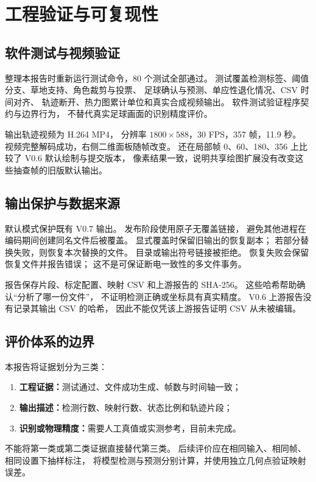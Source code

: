 \documentclass[UTF8,fontset=fandol,11pt,a4paper]{ctexart}
\begin{document}
\section{工程验证与可复现性}

\subsection{软件测试与视频验证}
整理本报告时重新运行测试命令，80 个测试全部通过。
测试覆盖检测标签、阈值分支、草地支持、角色裁剪与投票、
足球确认与预测、单应性退化情况、CSV 时间对齐、
轨迹断开、热力图累计单位和真实合成视频输出。
软件测试验证程序契约与边界行为，
不替代真实足球画面的识别精度评价。

输出轨迹视频为 H.264 MP4，
分辨率 $1800\times588$，30 FPS，357 帧，11.9 秒。
视频完整解码成功，右侧二维面板随帧改变。
还在局部帧 0、60、180、356 上比较了 V0.6 默认绘制与提交版本，
像素结果一致，说明共享绘图扩展没有改变这些抽查帧的旧版默认输出。

\subsection{输出保护与数据来源}
默认模式保护既有 V0.7 输出。
发布阶段使用原子无覆盖链接，
避免其他进程在编码期间创建同名文件后被覆盖。
显式覆盖时保留旧输出的恢复副本；
若部分替换失败，则恢复本次替换的文件。
目录或输出符号链接被拒绝。
恢复失败会保留恢复文件并报告错误；
这不是可保证断电一致性的多文件事务。

报告保存片段、标定配置、映射 CSV 和上游报告的 SHA-256。
这些哈希帮助确认“分析了哪一份文件”，
不证明检测正确或坐标具有真实精度。
V0.6 上游报告没有记录其输出 CSV 的哈希，
因此不能仅凭该上游报告证明 CSV 从未被编辑。

\subsection{评价体系的边界}
本报告将证据划分为三类：
\begin{enumerate}
 \item \textbf{工程证据：}测试通过、文件成功生成、帧数与时间轴一致；
 \item \textbf{输出描述：}检测行数、映射行数、状态比例和轨迹片段；
 \item \textbf{识别或物理精度：}需要人工真值或实测参考，目前未完成。
\end{enumerate}
不能将第一类或第二类证据直接替代第三类。
后续评价应在相同输入、相同帧、相同设置下抽样标注，
将模型检测与预测分别计算，并使用独立几何点验证映射误差。
\end{document}
